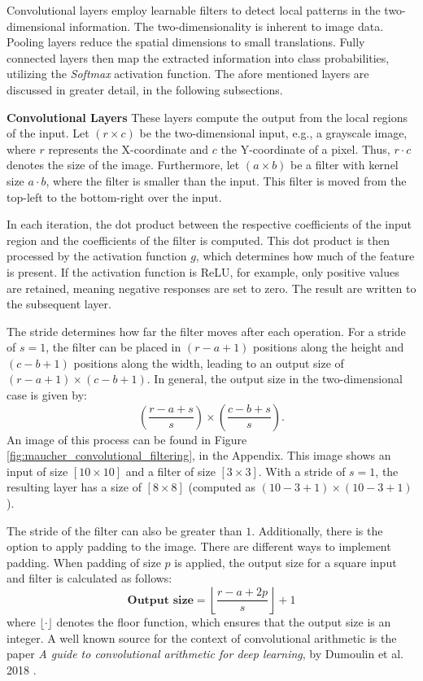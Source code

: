 Convolutional layers employ learnable filters to detect local patterns in the two-dimensional information. The two-dimensionality is inherent to image data. Pooling layers reduce the spatial dimensions to small translations. Fully connected layers then map the extracted information into class probabilities, utilizing the \textit{Softmax} activation function. The afore mentioned layers are discussed in greater detail, in the following subsections.

\vspace{1em}

\textbf{Convolutional Layers}\label{theoretical_classification_conv_layers}
These layers compute the output from the local regions of the input. Let $(r \times c)$ be the two-dimensional input, e.g., a grayscale image, where $r$ represents the X-coordinate and $c$ the Y-coordinate of a pixel. Thus, $r \cdot c$ denotes the size of the image. Furthermore, let $(a \times b)$ be a filter with kernel size $a \cdot b$, where the filter is smaller than the input. This filter is moved from the top-left to the bottom-right over the input.

In each iteration, the dot product between the respective coefficients of the input region and the coefficients of the filter is computed. This dot product is then processed by the activation function $g$, which determines how much of the feature is present. If the activation function is ReLU, for example, only positive values are retained, meaning negative responses are set to zero. The result are written to the subsequent layer.

The stride determines how far the filter moves after each operation. For a stride of $s = 1$, the filter can be placed in $(r - a + 1)$ positions along the height and $(c - b + 1)$ positions along the width, leading to an output size of $(r - a + 1) \times (c - b + 1)$. In general, the output size in the two-dimensional case is given by:
\[
\left( \frac{r - a + s}{s} \right) \times \left( \frac{c - b + s}{s} \right).
\]
An image of this process can be found in Figure \ref{fig:maucher_convolutional_filtering}, in the Appendix. This image shows an input of size $[10 \times 10]$ and a filter of size $[3 \times 3]$. With a stride of $s = 1$, the resulting layer has a size of $[8 \times 8]$ (computed as $\left(10 - 3 + 1\right) \times \left(10 - 3 + 1\right)$). 

The stride of the filter can also be greater than $1$. Additionally, there is the option to apply padding to the image. There are different ways to implement padding. When padding of size $p$ is applied, the output size for a square input and filter is calculated as follows:
\[
\textbf{Output size} = \left\lfloor \frac{r - a + 2p}{s} \right\rfloor + 1
\]
where $\lfloor \cdot \rfloor$ denotes the floor function, which ensures that the output size is an integer. A well known source for the context of convolutional arithmetic is the paper \textit{A guide to convolutional arithmetic for deep learning}, by Dumoulin et al. 2018 \cite{Dumoulin2016TransposedConv}.

